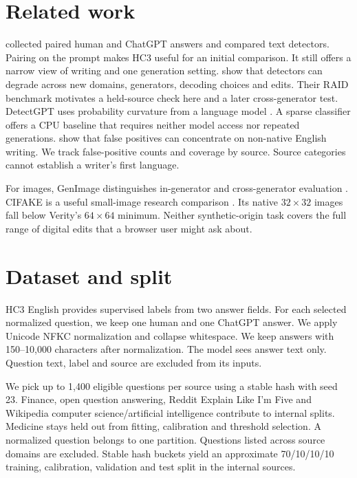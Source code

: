 \documentclass[11pt]{article}
\begin{document}
\section{Related work}

\citet{guo2023hc3} collected paired human and ChatGPT answers and compared text detectors. Pairing on the prompt makes HC3 useful for an initial comparison. It still offers a narrow view of writing and one generation setting. \citet{dugan2024raid} show that detectors can degrade across new domains, generators, decoding choices and edits. Their RAID benchmark motivates a held-source check here and a later cross-generator test. DetectGPT uses probability curvature from a language model \citep{mitchell2023detectgpt}. A sparse classifier offers a CPU baseline that requires neither model access nor repeated generations. \citet{liang2023bias} show that false positives can concentrate on non-native English writing. We track false-positive counts and coverage by source. Source categories cannot establish a writer's first language.

For images, GenImage distinguishes in-generator and cross-generator evaluation \citep{zhu2023genimage}. CIFAKE is a useful small-image research comparison \citep{bird2024cifake}. Its native $32\times32$ images fall below Verity's $64\times64$ minimum. Neither synthetic-origin task covers the full range of digital edits that a browser user might ask about.

\section{Dataset and split}

HC3 English provides supervised labels from two answer fields. For each selected normalized question, we keep one human and one ChatGPT answer. We apply Unicode NFKC normalization and collapse whitespace. We keep answers with 150--10,000 characters after normalization. The model sees answer text only. Question text, label and source are excluded from its inputs.

We pick up to 1,400 eligible questions per source using a stable hash with seed 23. Finance, open question answering, Reddit Explain Like I'm Five and Wikipedia computer science/artificial intelligence contribute to internal splits. Medicine stays held out from fitting, calibration and threshold selection. A normalized question belongs to one partition. Questions listed across source domains are excluded. Stable hash buckets yield an approximate 70/10/10/10 training, calibration, validation and test split in the internal sources.
\end{document}
